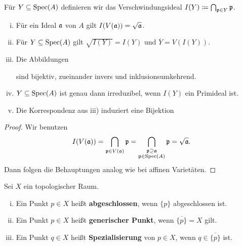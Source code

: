 \begin{prop}
\label{prop:4.4}
	Für $Y\subseteq \operatorname{Spec}(A)$ definieren wir das Verschwindungsideal $I(Y) \coloneqq \bigcap_{\mathfrak{p} \in Y} \mathfrak{p}$.
	\begin{enumerate}[i)]
		\item Für ein Ideal $\mathfrak{a}$ von $A$ gilt $I(V(\mathfrak{a})) = \sqrt{\mathfrak{a}}$.
		\item Für $Y \subseteq \operatorname{Spec}(A)$ gilt $\sqrt{I(Y)}=I(Y)$ und $\overline{Y} = V(I(Y))$.
		\item Die Abbildungen
		\begin{center}
		\end{center}
		sind bijektiv, zueinander invers und inklusionsumkehrend.
		\item $Y \subseteq \operatorname{Spec}(A)$ ist genau dann irreduzibel, wenn $I(Y)$ ein Primideal ist.
		\item Die Korrespondenz aus iii) induziert eine Bijektion
		\begin{center}
		\end{center}
	\end{enumerate}
	\begin{proof}
		Wir benutzen
		\[
			I(V(\mathfrak{a})) = \bigcap_{\mathfrak{p} \in V(\mathfrak{a})}\mathfrak{p} = \bigcap_{\substack{\mathfrak{p} \supseteq \mathfrak{a}\\\mathfrak{p} \in \operatorname{Spec}(A)}}\mathfrak{p} = \sqrt{\mathfrak{a}}.
		\]
		Dann folgen die Behauptungen analog wie bei affinen Varietäten.
	\end{proof}
\end{prop}

\begin{defn}
	Sei $X$ ein topologischer Raum.
	\begin{enumerate}[i)]
		\item Ein Punkt $p \in X$ heißt \textbf{abgeschlossen}, wenn $\{p\}$ abgeschlossen ist.
		\item Ein Punkt $p \in X$ heißt \textbf{generischer Punkt}, wenn $\overline{\{p\}} = X$ gilt.
		\item Ein Punkt $q \in X$ heißt \textbf{Spezialisierung} von $p \in X$, wenn $q \in \overline{\{p\}}$ ist.
	\end{enumerate}
\end{defn}

